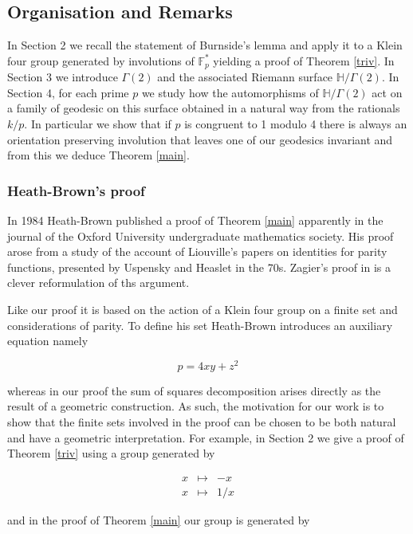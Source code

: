 \documentclass[12pt,a4paper]{amsart}
\def\HH{\mathbb{H}}
\def\xx{\HH/g2}
\def\fp{\mathbb{F}_p}
\def\g2{\Gamma(2)}
\def\xx{\HH/\g2}
\begin{document}
\subsection{Organisation and Remarks}

In Section 2 we recall the statement of Burnside's lemma 
and apply it to a Klein four group generated by involutions of $\fp^*$
yielding a proof of Theorem \ref{triv}. In Section 3 we introduce $\g2$
and the associated Riemann surface $\xx$. 
In Section 4, for each prime $p$
we study how the automorphisms of $\xx$ 
act on a family of geodesic on this surface
obtained in a natural way from the rationals $k/p$.
In particular we show 
that if $p$ is congruent to 1 modulo 4
there is always an orientation preserving involution that
leaves one of our geodesics invariant
and from this we deduce Theorem \ref{main}.

\subsubsection{Heath-Brown's proof}

In 1984 Heath-Brown published a proof of Theorem \ref{main}
apparently  in the journal of the Oxford University undergraduate mathematics society. 
His proof arose from a study of the account of Liouville’s papers on identities for parity functions, presented  by Uspensky and Heaslet in the 70s. Zagier's proof in \cite{zagier} is a clever reformulation of ths argument.

Like our  proof it is based on the action of a Klein four group on a
finite set and considerations of parity. To define his set
Heath-Brown introduces an auxiliary equation namely 

$$p = 4xy + z^2$$ 

whereas in our proof the sum of squares decomposition arises
directly as the  result of a geometric construction. As such, the
motivation for our work is to show that the finite sets involved in
the proof can be chosen to be both natural and have a geometric
interpretation. For example, in Section 2 we give a proof of Theorem
\ref{triv} using a group generated by 


$$ \begin{array}{lll} x
&\mapsto& -x \\ x &\mapsto& 1/x \end{array} $$

and in the proof of Theorem \ref{main} our group is generated by 
\end{document}
